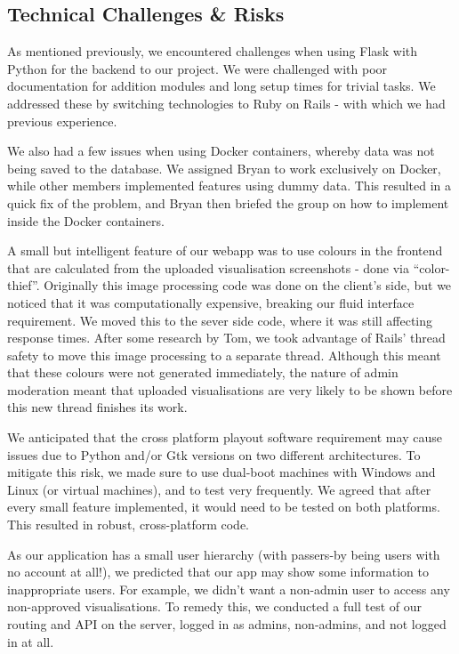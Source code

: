 \documentclass[a4paper, titlepage]{article}
\begin{document}
\subsection{Technical Challenges \& Risks}

As mentioned previously, we encountered challenges when using Flask with Python for the backend to our 
project. We were challenged with poor documentation for addition modules and long setup times for 
trivial tasks. We addressed these by switching technologies to Ruby on Rails - with which we had 
previous experience. 

We also had a few issues when using Docker containers, whereby data was not being saved to the database.
We assigned Bryan to work exclusively on Docker, while other members implemented features using dummy 
data. This resulted in a quick fix of the problem, and Bryan then briefed the group on how to implement
inside the Docker containers. 

A small but intelligent feature of our webapp was to use colours in the frontend that are calculated 
from the uploaded visualisation screenshots - done via ``color-thief''. Originally this image
processing code was done on the client's side, but we noticed that it was computationally expensive,
breaking our fluid interface requirement. We moved this to the sever side code, where it was still 
affecting response times. After some research by Tom, we took advantage of Rails' thread safety to move
this image processing to a separate thread. Although this meant that these colours were not generated 
immediately, the nature of admin moderation meant that uploaded visualisations are very likely to be 
shown before this new thread finishes its work.



We anticipated that the cross platform playout software requirement may cause issues due to Python
and/or Gtk versions on two different architectures. To mitigate this risk, we made sure to use dual-boot
machines with Windows and Linux (or virtual machines), and to test very frequently. We agreed that after
every small feature implemented, it would need to be tested on both platforms. This resulted in robust, 
cross-platform code.


As our application has a small user hierarchy (with passers-by being users with no account at all!), we 
predicted that our app may show some information to inappropriate users. For example, we didn't want a 
non-admin user to access any non-approved visualisations. To remedy this, we conducted a full test of
our routing and API on the server, logged in as admins, non-admins, and not logged in at all. 
\end{document}
